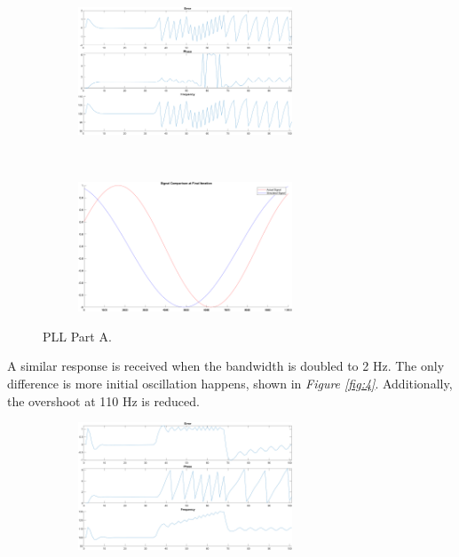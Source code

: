 \documentclass[10pt]{article}
\begin{document}
\begin{enumerate}[label=\textbf{\arabic*.}]
\begin{figure}[H]
    \begin{subfigure}{\textwidth}
      \centering
      \includegraphics[width=0.7\textwidth]{p2_a.png}
    \end{subfigure}%
    \\
    \begin{subfigure}{\textwidth}
      \centering
      \includegraphics[width=0.7\textwidth]{p2_a_wave.png}
    \end{subfigure}%
    \caption{PLL Part A.}
    \label{fig:3}
  \end{figure}
  A similar response is received when the bandwidth is doubled to 2 Hz. The only 
  difference is more initial oscillation happens, shown in 
  \emph{Figure \ref{fig:4}}. Additionally, the overshoot at 110 Hz is reduced.
  \begin{figure}[H]
    \centering
    \begin{subfigure}{\textwidth}
      \centering
      \includegraphics[width=0.7\textwidth]{p2_b.png}

\end{subfigure}
\end{figure}
\end{enumerate}
\end{document}
